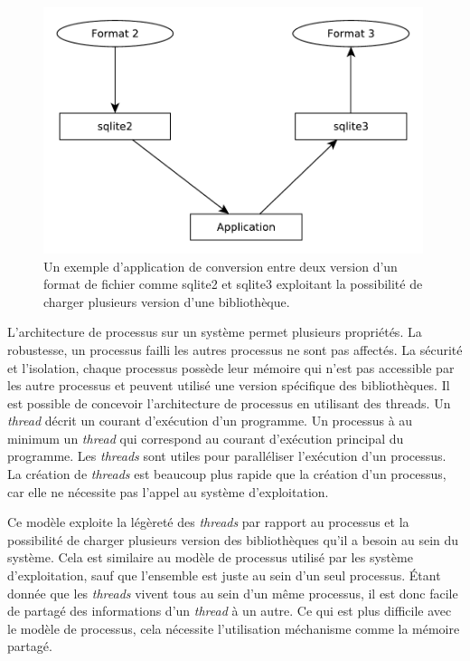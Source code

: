 \begin{figure}[ht]
  \includegraphics[width=30em]{figures/app_convert_v1_to_v2.pdf}
  \caption{Un exemple d'application de conversion entre deux version d'un format
  de fichier comme sqlite2 et sqlite3 exploitant la possibilité de charger plusieurs
  version d'une bibliothèque.}
\end{figure}

L'architecture de processus sur un système permet plusieurs propriétés. La
robustesse, un processus failli les autres processus ne sont pas affectés. La
sécurité et l'isolation, chaque processus possède leur mémoire qui n'est pas
accessible par les autre processus et peuvent utilisé une version spécifique
des bibliothèques. Il est possible de concevoir l'architecture de processus en
utilisant des threads.  Un \textit{thread} décrit un courant d'exécution d'un
programme. Un processus à au minimum un \textit{thread} qui correspond au
courant d'exécution principal du programme. Les \textit{threads} sont utiles
pour paralléliser l'exécution d'un processus. La création de \textit{threads}
est beaucoup plus rapide que la création d'un processus, car elle ne nécessite
pas l'appel au système d'exploitation.

Ce modèle exploite la légèreté des \textit{threads} par rapport au processus et
la possibilité de charger plusieurs version des bibliothèques qu'il a besoin au sein
du système. Cela est similaire au modèle de processus utilisé par les
système d'exploitation, sauf que l'ensemble est juste au sein d'un seul processus.
Étant donnée que les \textit{threads} vivent tous au sein d'un même processus,
il est donc facile de partagé des informations d'un \textit{thread} à un autre.
Ce qui est plus difficile avec le modèle de processus, cela nécessite l'utilisation
méchanisme comme la mémoire partagé.


